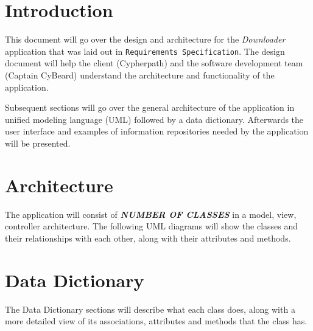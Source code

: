 \documentclass{article}
\title{}
\author{}
\date{}
\begin{document}



\tableofcontents
\newpage
\listoffigures
\newpage

\begin{versionhistory}
\end{versionhistory}
\newpage

\section{Introduction}
This document will go over the design and architecture for the \textit{Downloader} application that was laid out in
\texttt{Requirements Specification}\cite{reqs}. The design document will help the client (Cypherpath) and the
software development team (Captain CyBeard) understand the architecture and functionality of the application.

Subsequent sections will go over the general architecture of the application in unified modeling language
(UML) followed by a data dictionary. Afterwards the user interface and examples of information repositories needed
by the application will be presented.

\section{Architecture}
The application will consist of \textbf{\textit{NUMBER OF CLASSES}} in a model, view, controller architecture. The following
UML diagrams will show the classes and their relationships with each other, along with their attributes and methods.


\section{Data Dictionary}
The Data Dictionary sections will describe what each class does, along with a more detailed view of its
associations, attributes and methods that the class has.



%
%
%
%
%
\end{document}
